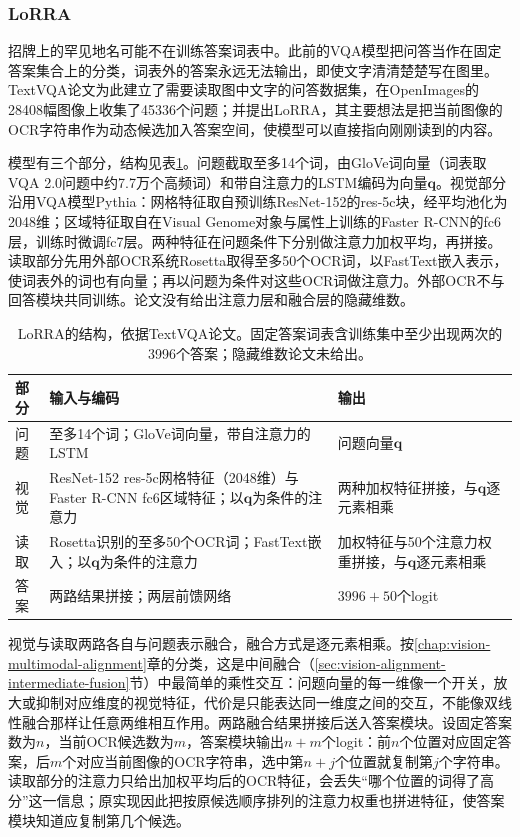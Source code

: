 \subsubsection{LoRRA}
\label{sec:vision-understanding-lorra}

招牌上的罕见地名可能不在训练答案词表中。此前的VQA模型把问答当作在固定答案集合上的分类，词表外的答案永远无法输出，即使文字清清楚楚写在图里。TextVQA论文为此建立了需要读取图中文字的问答数据集，在OpenImages的28408幅图像上收集了45336个问题；并提出LoRRA，其主要想法是把当前图像的OCR字符串作为动态候选加入答案空间，使模型可以直接指向刚刚读到的内容。

模型有三个部分，结构见表\ref{tab:vision-understanding-lorra-config}。问题截取至多14个词，由GloVe词向量（词表取VQA 2.0问题中约7.7万个高频词）和带自注意力的LSTM编码为向量$\bm q$。视觉部分沿用VQA模型Pythia：网格特征取自预训练ResNet-152的res-5c块，经平均池化为2048维；区域特征取自在Visual Genome对象与属性上训练的Faster R-CNN的fc6层，训练时微调fc7层。两种特征在问题条件下分别做注意力加权平均，再拼接。读取部分先用外部OCR系统Rosetta取得至多50个OCR词，以FastText嵌入表示，使词表外的词也有向量；再以问题为条件对这些OCR词做注意力。外部OCR不与回答模块共同训练。论文没有给出注意力层和融合层的隐藏维数。

\begin{table}[htbp]
  \centering
  \small
  \begin{tabularx}{\linewidth}{@{}p{14mm}XX@{}}
    \toprule
    部分 & 输入与编码 & 输出\\
    \midrule
    问题 & 至多14个词；GloVe词向量，带自注意力的LSTM & 问题向量$\bm q$\\
    视觉 & ResNet-152 res-5c网格特征（2048维）与Faster R-CNN fc6区域特征；以$\bm q$为条件的注意力 & 两种加权特征拼接，与$\bm q$逐元素相乘\\
    读取 & Rosetta识别的至多50个OCR词；FastText嵌入；以$\bm q$为条件的注意力 & 加权特征与50个注意力权重拼接，与$\bm q$逐元素相乘\\
    答案 & 两路结果拼接；两层前馈网络 & $3996+50$个logit\\
    \bottomrule
  \end{tabularx}
  \caption{LoRRA的结构，依据TextVQA论文。固定答案词表含训练集中至少出现两次的3996个答案；隐藏维数论文未给出。}
  \label{tab:vision-understanding-lorra-config}
\end{table}

视觉与读取两路各自与问题表示融合，融合方式是逐元素相乘。按\ref{chap:vision-multimodal-alignment}章的分类，这是中间融合（\ref{sec:vision-alignment-intermediate-fusion}节）中最简单的乘性交互：问题向量的每一维像一个开关，放大或抑制对应维度的视觉特征，代价是只能表达同一维度之间的交互，不能像双线性融合那样让任意两维相互作用。两路融合结果拼接后送入答案模块。设固定答案数为$n$，当前OCR候选数为$m$，答案模块输出$n+m$个logit：前$n$个位置对应固定答案，后$m$个对应当前图像的OCR字符串，选中第$n+j$个位置就复制第$j$个字符串。读取部分的注意力只给出加权平均后的OCR特征，会丢失“哪个位置的词得了高分”这一信息；原实现因此把按原候选顺序排列的注意力权重也拼进特征，使答案模块知道应复制第几个候选。

